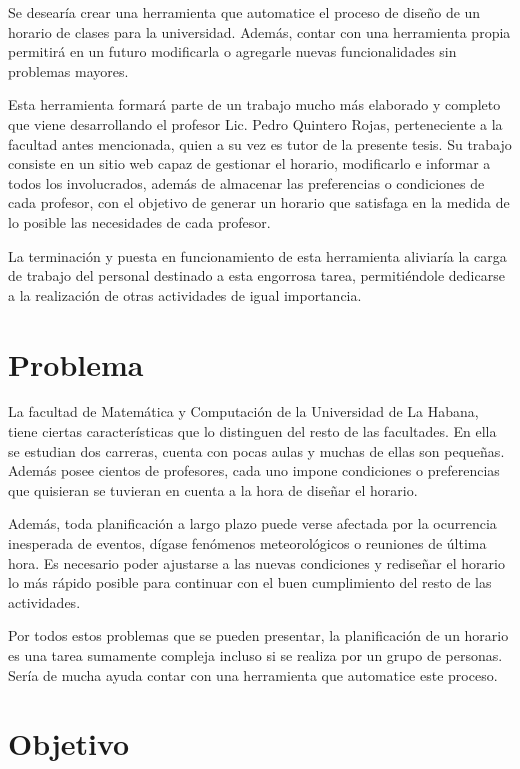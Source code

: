 \begin{introduction}
Se desear\'ia crear una herramienta que automatice el proceso de diseño de un horario de clases para la universidad.
Además, contar con una herramienta propia permitirá en un futuro modificarla o agregarle nuevas
funcionalidades sin problemas mayores.

Esta herramienta formará parte de un trabajo mucho más elaborado y completo que viene desarrollando
el profesor Lic. Pedro Quintero Rojas, perteneciente a la facultad antes mencionada, quien a su vez
es tutor de la presente tesis. Su trabajo consiste en un sitio web capaz de gestionar el horario,
modificarlo e informar a todos los involucrados, además de almacenar las preferencias o condiciones
de cada profesor, con el objetivo de generar un horario que satisfaga en la medida de lo posible
las necesidades de cada profesor.

La terminación y puesta en funcionamiento de esta herramienta aliviar\'ia la carga de trabajo del
personal destinado a esta engorrosa tarea, permiti\'endole dedicarse a la realización de otras
actividades de igual importancia.

\section*{Problema}

La facultad de Matemática y Computación de la Universidad de La Habana, tiene ciertas
características que lo distinguen del resto de las facultades. En ella se estudian dos carreras,
cuenta con pocas aulas y muchas de ellas son pequeñas. Adem\'as posee cientos de profesores, cada uno
impone condiciones o preferencias que quisieran se tuvieran en cuenta a la hora de diseñar el horario.

Además, toda planificación a largo plazo puede verse afectada por la ocurrencia inesperada de eventos,
d\'igase fenómenos meteorológicos o reuniones de última hora. Es necesario poder ajustarse a las nuevas
condiciones y rediseñar el horario lo más rápido posible para continuar con el buen cumplimiento del
resto de las actividades.

Por todos estos problemas que se pueden presentar, la planificación de un horario es una tarea sumamente 
compleja incluso si se realiza por un grupo de personas. Ser\'ia de mucha ayuda contar con una herramienta
que automatice este proceso.

\section*{Objetivo}


\end{introduction}
